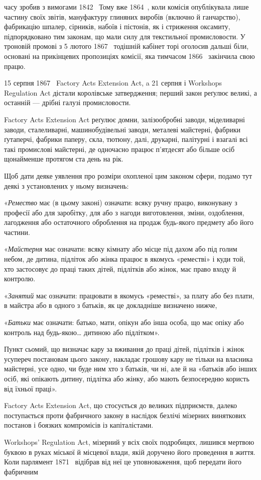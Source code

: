 \parcont{}  %
часу зробив з вимогами 1842~ Тому вже 1864~, коли комісія
опублікувала лише частину своїх звітів, мануфактуру глиняних
виробів (включно й ганчарство), фабрикацію шпалер, сірників,
набоїв і пістонів, як і стриження оксамиту, підпорядковано
тим законам, що мали силу для текстильної промисловости.
У троновій промові з 5 лютого 1867~ тодішній кабінет торі
оголосив дальші біли, основані на прикінцевих пропозиціях
комісії, яка тимчасом 1866~ закінчила свою працю.

15 серпня 1867~ Factory Acts Extension Act, a 21 серпня і
Workshops Regulation Act дістали королівське затвердження;
перший закон реґулює великі, а останній — дрібні галузі промисловости.

Factory Acts Extension Act реґулює домни, залізообробні
заводи, міделиварні заводи, сталеливарні, машинобудівельні заводи,
металеві майстерні, фабрики ґутаперчі, фабрики паперу,
скла, тютюну, далі, друкарні, палітурні і взагалі всі такі промислові
майстерні, де одночасно працює п’ятдесят або більше осіб
щонайменше протягом ста день на рік.

Щоб дати деяке уявлення про розміри охопленої цим законом
сфери, подамо тут деякі з установлених у ньому визначень:

«\emph{Ремество} має (в цьому законі) означати: всяку ручну
працю, виконувану з професії або для заробітку, для або з
нагоди виготовлення, зміни, оздоблення, лагодження або остаточного
оброблення на продаж будь-якого предмету або його
частини.

«\emph{Майстерня} має означати: всяку кімнату або місце під дахом
або під голим небом, де дитина, підліток або жінка працює в
якомусь «реместві» і куди той, хто застосовує до праці таких
дітей, підлітків або жінок, має право входу й контролю.

«\emph{Занятий} має означати: працювати в якомусь «реместві»,
за плату або без плати, в майстра або в одного з батьків, як це
докладніше визначено нижче,

«\emph{Батьки} має означати: батько, мати, опікун або інша особа,
що має опіку або контроль над будь-якою\dots{} дитиною або підлітком».

Пункт сьомий, що визначає кару за вживання до праці дітей,
підлітків і жінок усупереч постановам цього закону, накладає
грошову кару не тільки на власника майстерні, усе одно, чи буде
ним хто з батьків, чи ні, але й на «батьків або інших осіб, які
опікають дитину, підлітка або жінку, або мають безпосередню
користь від їхньої праці».

Factory Acts Extension Act, що стосується до великих підприємств,
далеко поступається проти фабричного закону в наслідок
безлічі мізерних виняткових постанов і боязких компромісів
із капіталістами.

Workshops’ Regulation Act, мізерний у всіх своїх подробицях,
лишився мертвою буквою в руках міської й місцевої влади, якій
доручено його проведення в життя. Коли парлямент 1871~
відібрав від неї це уповноваження, щоб передати його фабричним
\parbreak{}  %
